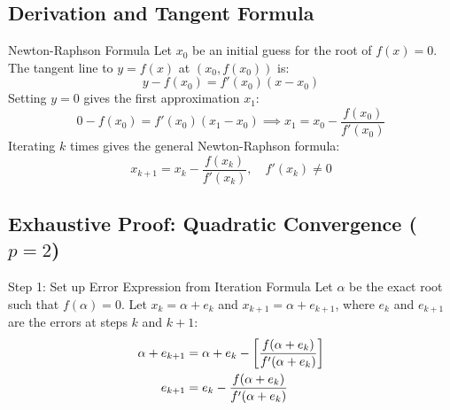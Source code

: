 \documentclass[11pt,a4paper]{article}
\begin{document}
\subsection{Derivation and Tangent Formula}

\begin{center}
\end{center}

\begin{formulabox}{Newton-Raphson Formula}
Let $x_0$ be an initial guess for the root of $f(x) = 0$. The tangent line to $y = f(x)$ at $(x_0, f(x_0))$ is:
\begin{equation}
    y - f(x_0) = f'(x_0)(x - x_0)
\end{equation}
Setting $y = 0$ gives the first approximation $x_1$:
\begin{equation}
    0 - f(x_0) = f'(x_0)(x_1 - x_0) \implies x_1 = x_0 - \frac{f(x_0)}{f'(x_0)}
\end{equation}
Iterating $k$ times gives the general Newton-Raphson formula:
\begin{equation}
    x_{k+1} = x_k - \frac{f(x_k)}{f'(x_k)}, \quad f'(x_k) \neq 0
\end{equation}
\end{formulabox}

\subsection{\texorpdfstring{Exhaustive Proof: Quadratic Convergence ($p = 2$)}{Exhaustive Proof: Quadratic Convergence (p = 2)}}

\begin{exbox}{Step 1: Set up Error Expression from Iteration Formula}
Let $\alpha$ be the exact root such that $f(\alpha) = 0$. Let $x_k = \alpha + e_k$ and $x_{k+1} = \alpha + e_{k+1}$, where $e_k$ and $e_{k+1}$ are the errors at steps $k$ and $k+1$:
\begin{align}
    \alpha + e_{k+1} &= \alpha + e_k - \left[ \frac{f(\alpha + e_k)}{f'(\alpha + e_k)} \right] \notag \\
    e_{k+1} &= e_k - \frac{f(\alpha + e_k)}{f'(\alpha + e_k)}
\end{align}
\end{exbox}
\end{document}
